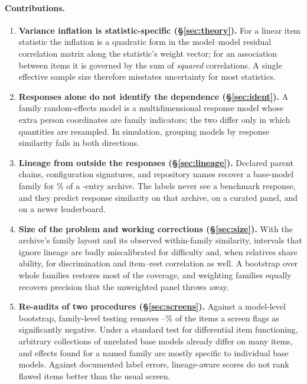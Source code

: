 \documentclass[10pt]{article}
\theoremstyle{remark}\newtheorem{remark}{Remark}
\begin{document}
\paragraph{Contributions.}
\begin{enumerate}\itemsep2pt
\item \textbf{Variance inflation is statistic-specific
  (\S\ref{sec:theory}).} For a linear item statistic the inflation is a
  quadratic form in the model--model residual correlation matrix along the
  statistic's weight vector; for an association between items it is governed by
  the sum of \emph{squared} correlations. A single effective sample size
  therefore misstates uncertainty for most statistics.
\item \textbf{Responses alone do not identify the dependence
  (\S\ref{sec:ident}).} A family random-effects model is a multidimensional
  response model whose extra person coordinates are family indicators; the two
  differ only in which quantities are resampled. In simulation, grouping models
  by response similarity fails in both directions.
\item \textbf{Lineage from outside the responses (\S\ref{sec:lineage}).}
  Declared parent chains, configuration signatures, and repository names
  recover a base-model family for \LineageCoverage\% of a \NModels-entry
  archive. The labels never see a benchmark response, and they predict
  response similarity on that archive, on a curated panel, and on a newer
  leaderboard.
\item \textbf{Size of the problem and working corrections
  (\S\ref{sec:size}).} With the archive's family layout and its observed
  within-family similarity, intervals that ignore lineage are badly
  miscalibrated for difficulty and, when relatives share ability, for
  discrimination and item--rest correlation as well. A bootstrap over whole
  families restores most of the coverage, and weighting families equally
  recovers precision that the unweighted panel throws away.
\item \textbf{Re-audits of two procedures (\S\ref{sec:screens}).} Against a
  model-level bootstrap, family-level testing removes
  \ScreenLostMin--\ScreenLostMax\% of the items a screen flags as significantly
  negative. Under a standard test
  for differential item functioning, arbitrary collections of unrelated base
  models already differ on many items, and effects found for a named family
  are mostly specific to individual base models. Against documented label
  errors, lineage-aware scores do not rank flawed items better than the usual
  screen.
\end{enumerate}
\end{document}
